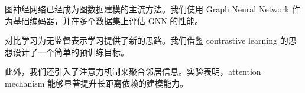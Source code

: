 图神经网络已经成为图数据建模的主流方法。我们使用 Graph Neural Network 作为基础编码器，并在多个数据集上评估 GNN 的性能。

对比学习为无监督表示学习提供了新的思路。我们借鉴 contrastive learning 的思想设计了一个简单的预训练目标。

此外，我们还引入了注意力机制来聚合邻居信息。实验表明，attention mechanism 能够显著提升长距离依赖的建模能力。
